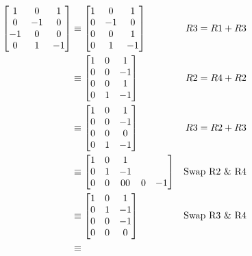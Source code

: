 \documentclass{../mathhomework}
\newenvironment{Mat}{\begin{bmatrix}}{\end{bmatrix}}
\begin{document}
\begin{problem}[1.4\#21]
    \begin{solution}
        \begin{align*}
            \begin{Mat}
                1 & 0 & 1 \\
                0 & -1 & 0 \\
                -1 & 0 & 0 \\
                0 & 1 & -1
            \end{Mat} & \equiv
            \begin{Mat}
                1 & 0 & 1 \\
                0 & -1 & 0 \\
                0 & 0 & 1 \\
                0 & 1 & -1
            \end{Mat} & R3 = R1 + R3 \\ & \equiv
            \begin{Mat}
                1 & 0 & 1 \\
                0 & 0 & -1 \\
                0 & 0 & 1 \\
                0 & 1 & -1
            \end{Mat} & R2 = R4 + R2 \\ & \equiv
            \begin{Mat}
                1 & 0 & 1 \\
                0 & 0 & -1 \\
                0 & 0 & 0 \\
                0 & 1 & -1
            \end{Mat} & R3 = R2 + R3 \\ & \equiv
            \begin{Mat}
                1 & 0 & 1 \\
                0 & 1 & -1 \\
                0 & 0 & 0 
                0 & 0 & -1 \\
            \end{Mat} & \text{Swap R2 \& R4}\\ & \equiv
            \begin{Mat}
                1 & 0 & 1 \\
                0 & 1 & -1 \\
                0 & 0 & -1 \\
                0 & 0 & 0 
            \end{Mat} & \text{Swap R3 \& R4}\\ & \equiv

\end{align*}
\end{solution}
\end{problem}
\end{document}
